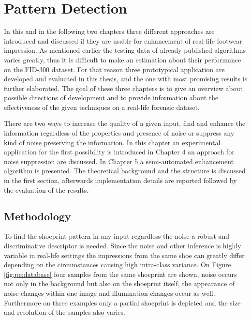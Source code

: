 \documentclass[draft,final]{vutinfth} %
\begin{document}
\chapter{Pattern Detection}
\par
In this and in the following two chapters three different approaches are introduced and discussed if they are usable for enhancement of real-life footwear impression.
As mentioned earlier the testing data of already published algorithms varies greatly, thus it is difficult to make an estimation about their performance on the FID-300  \cite{kortylewski2014unsupervised} dataset.
For that reason three prototypical application are developed and evaluated in this thesis, and the one with most promising results is further elaborated.
The goal of these three chapters is to give an overview about possible directions of development and to provide information about the effectiveness of the given techniques on a real-life forensic dataset.
\par
There are two ways to increase the quality of a given input, find and enhance the information regardless of the properties and presence of noise or suppress any kind of noise preserving the information.
In this chapter an experimental application for the first possibility is introduced in Chapter 4 an approach for noise suppression are discussed.
In Chapter 5 a semi-automated enhancement algorithm is presented.
The theoretical background and the structure is discussed in the first section, afterwards implementation details are reported followed by the evaluation of the results.

\section{Methodology}
\par
To find the shoeprint pattern in any input regardless the noise a robust and discriminative descriptor is needed.
Since the noise and other inference is highly variable in real-life settings the impressions from the same shoe can greatly differ depending on the circumstances causing high intra-class variance.
On Figure \ref{fig:pe:database} four samples from the same shoeprint are shown, noise occurs not only in the background but also on the shoeprint itself, the appearance of noise changes within one image and illumination changes occur as well.
Furthermore on three examples only a partial shoeprint is depicted and the size and resolution of the samples also varies.
\end{document}
